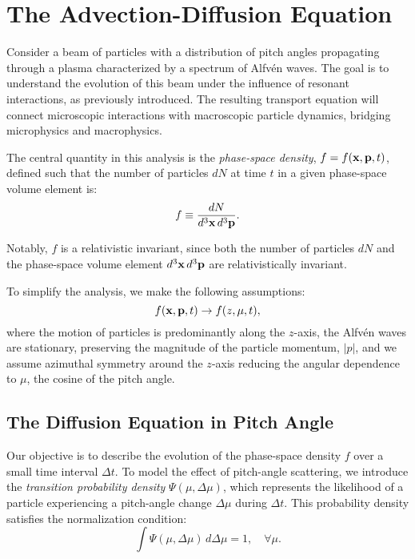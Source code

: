 \section{The Advection-Diffusion Equation}

Consider a beam of particles with a distribution of pitch angles propagating through a plasma characterized by a spectrum of Alfvén waves. The goal is to understand the evolution of this beam under the influence of resonant interactions, as previously introduced. The resulting transport equation will connect microscopic interactions with macroscopic particle dynamics, bridging microphysics and macrophysics.

The central quantity in this analysis is the \emph{phase-space density}, \( f = f(\vb{x}, \vb{p}, t) \), defined such that the number of particles \( dN \) at time \( t \) in a given phase-space volume element is:
\[
f \equiv \frac{dN}{d^3 \vb{x} \, d^3 \vb{p}}.
\]

Notably, \( f \) is a relativistic invariant, since both the number of particles \( dN \) and the phase-space volume element \( d^3 \vb{x} \, d^3 \vb{p} \) are relativistically invariant.

To simplify the analysis, we make the following assumptions:
\[
f(\vb{x}, \vb{p}, t) \rightarrow f(z, \mu, t),
\]
where the motion of particles is predominantly along the \( z \)-axis, the Alfvén waves are stationary, preserving the magnitude of the particle momentum, \( |p| \), and we assume azimuthal symmetry around the \( z \)-axis reducing the angular dependence to \( \mu \), the cosine of the pitch angle.

\subsection{The Diffusion Equation in Pitch Angle}

Our objective is to describe the evolution of the phase-space density \( f \) over a small time interval \( \Delta t \). To model the effect of pitch-angle scattering, we introduce the \emph{transition probability density} \( \Psi(\mu, \Delta\mu) \), which represents the likelihood of a particle experiencing a pitch-angle change \( \Delta\mu \) during \( \Delta t \). This probability density satisfies the normalization condition:
\begin{equation}
\int \Psi(\mu, \Delta\mu) \, d\Delta\mu = 1, \quad \forall \mu.
\end{equation}

